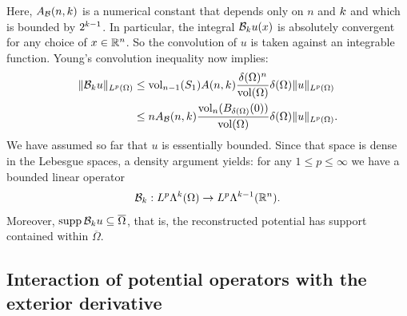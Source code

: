 \documentclass[10pt,a4paper]{article}
\begin{document}
Here, $A_{{\mathcal B}}(n,k)$ is a numerical constant that depends only on $n$ and $k$ 
and which is bounded by $2^{k-1}$. 
In particular, the integral ${\mathcal B}_{k} u(x)$ is absolutely convergent for any choice of $x \in {\mathbb R}^{n}$. 
So the convolution of $u$ is taken against an integrable function. 
Young's convolution inequality now implies: 
\begin{align*}
    \| {\mathcal B}_{k} u \|_{L^{p}(\Omega)}
    &
    \leq 
    \operatorname{vol}_{n-1}(S_1) A(n,k) \frac{ {\delta}(\Omega)^{n} }{\operatorname{vol}(\Omega)} 
    {\delta}(\Omega)
    \| u \|_{L^{p}(\Omega)}
    \\&
    \leq 
    n A_{{\mathcal B}}(n,k) \frac{ \operatorname{vol}_{n}(B_{{\delta}(\Omega)}(0)) }{\operatorname{vol}(\Omega)} 
    {\delta}(\Omega)
    \| u \|_{L^{p}(\Omega)}
    .
\end{align*}
We have assumed so far that $u$ is essentially bounded.
Since that space is dense in the Lebesgue spaces, a density argument yields: 
for any $1 \leq p \leq \infty$ we have a bounded linear operator 
\begin{gather*}
    {\mathcal B}_{k} : L^{p}\Lambda^{k}(\Omega) \rightarrow L^{p}\Lambda^{k-1}({\mathbb R}^n).
\end{gather*}
Moreover, $\operatorname{supp} {\mathcal B}_{k} u \subseteq \overline\Omega$,
that is, the reconstructed potential has support contained within $\overline\Omega$. 
\\





\subsection{Interaction of potential operators with the exterior derivative}
\end{document}
